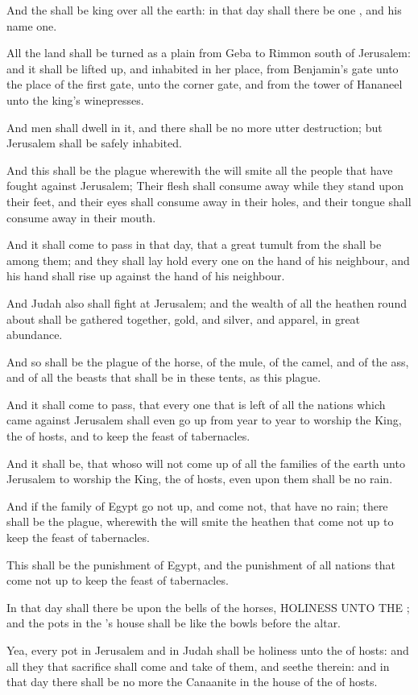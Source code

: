 \verse And the \LORD shall be king over all the earth: in that day shall there be one \LORD, and his name one.

\verse All the land shall be turned as a plain from Geba to Rimmon south of Jerusalem: and it shall be lifted up, and inhabited in her place, from Benjamin's gate unto the place of the first gate, unto the corner gate, and from the tower of Hananeel unto the king's winepresses.

\verse And men shall dwell in it, and there shall be no more utter destruction; but Jerusalem shall be safely inhabited.

\verse And this shall be the plague wherewith the \LORD will smite all the people that have fought against Jerusalem; Their flesh shall consume away while they stand upon their feet, and their eyes shall consume away in their holes, and their tongue shall consume away in their mouth.

\verse And it shall come to pass in that day, that a great tumult from the \LORD shall be among them; and they shall lay hold every one on the hand of his neighbour, and his hand shall rise up against the hand of his neighbour.

\verse And Judah also shall fight at Jerusalem; and the wealth of all the heathen round about shall be gathered together, gold, and silver, and apparel, in great abundance.

\verse And so shall be the plague of the horse, of the mule, of the camel, and of the ass, and of all the beasts that shall be in these tents, as this plague.

\verse And it shall come to pass, that every one that is left of all the nations which came against Jerusalem shall even go up from year to year to worship the King, the \LORD of hosts, and to keep the feast of tabernacles.

\verse And it shall be, that whoso will not come up of all the families of the earth unto Jerusalem to worship the King, the \LORD of hosts, even upon them shall be no rain.

\verse And if the family of Egypt go not up, and come not, that have no rain; there shall be the plague, wherewith the \LORD will smite the heathen that come not up to keep the feast of tabernacles.

\verse This shall be the punishment of Egypt, and the punishment of all nations that come not up to keep the feast of tabernacles.

\verse In that day shall there be upon the bells of the horses, HOLINESS UNTO THE \LORD; and the pots in the \LORD's house shall be like the bowls before the altar.

\verse Yea, every pot in Jerusalem and in Judah shall be holiness unto the \LORD of hosts: and all they that sacrifice shall come and take of them, and seethe therein: and in that day there shall be no more the Canaanite in the house of the \LORD of hosts.

